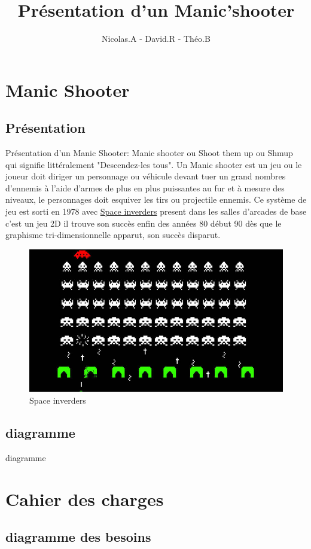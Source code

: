 \documentclass[a4paper, 11pt]{article}
\title{Présentation d'un Manic'shooter}
\author{Nicolas.A - David.R - Théo.B}
\begin{document}
\maketitle
\tableofcontents
\section{Manic Shooter}
\subsection{Présentation}

Présentation d'un Manic Shooter:
Manic shooter ou Shoot them up ou Shmup qui signifie littéralement "Descendez-les tous".
Un Manic shooter est un jeu ou le joueur doit diriger un personnage ou véhicule devant tuer un grand nombres d'ennemis à l'aide d'armes de plus en plus puissantes au fur et à mesure des niveaux, le personnages doit esquiver les tirs ou projectile ennemis.
Ce système de jeu est sorti en 1978 avec 
\href{http://dictionnaire.sensagent.leparisien.fr/Space%20Invaders/fr-fr/}{Space inverders}
 present dans les salles d'arcades de base c'est un jeu 2D il trouve son succès enfin des années 80 début 90 dès que le graphisme tri-dimensionnelle apparut, son succès disparut.

 \begin{figure}[ht!]
 \centering
 \includegraphics[width=0.7\linewidth]{space.jpg}
 \caption{Space inverders}
 \label{fig::example::one}
\end{figure}

\subsection{diagramme}
diagramme 

\section{Cahier des charges}

\subsection{diagramme des besoins}
\end{document}
